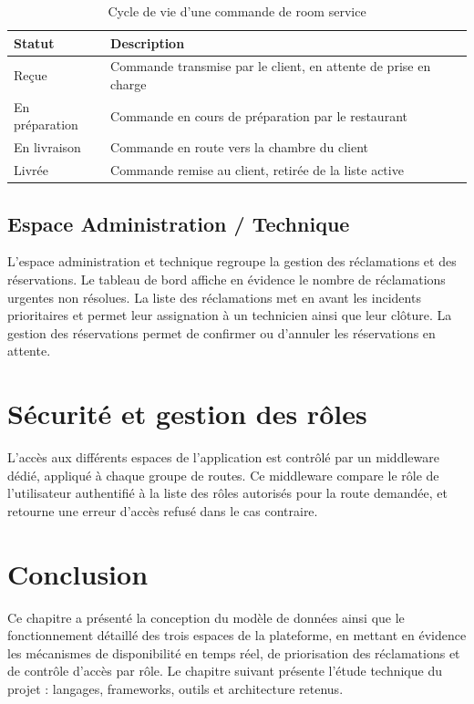 \documentclass[12pt,a4paper]{report}
\begin{document}
\begin{table}[H]
\centering
\begin{tabular}{p{2cm} p{9cm}}
\toprule
\textbf{Statut} & \textbf{Description} \\
\midrule
Reçue & Commande transmise par le client, en attente de prise en charge \\
En préparation & Commande en cours de préparation par le restaurant \\
En livraison & Commande en route vers la chambre du client \\
Livrée & Commande remise au client, retirée de la liste active \\
\bottomrule
\end{tabular}
\caption{Cycle de vie d'une commande de room service}
\label{tab:statuts}
\end{table}

\subsection{Espace Administration / Technique}

L'espace administration et technique regroupe la gestion des réclamations
et des réservations. Le tableau de bord affiche en évidence le nombre de
réclamations urgentes non résolues. La liste des réclamations met en avant
les incidents prioritaires et permet leur assignation à un technicien
ainsi que leur clôture. La gestion des réservations permet de confirmer ou
d'annuler les réservations en attente.

\section{Sécurité et gestion des rôles}

L'accès aux différents espaces de l'application est contrôlé par un
middleware dédié, appliqué à chaque groupe de routes. Ce middleware
compare le rôle de l'utilisateur authentifié à la liste des rôles
autorisés pour la route demandée, et retourne une erreur d'accès refusé
dans le cas contraire.

\section{Conclusion}

Ce chapitre a présenté la conception du modèle de données ainsi que le
fonctionnement détaillé des trois espaces de la plateforme, en mettant en
évidence les mécanismes de disponibilité en temps réel, de priorisation
des réclamations et de contrôle d'accès par rôle. Le chapitre suivant
présente l'étude technique du projet : langages, frameworks, outils et
architecture retenus.
\end{document}
